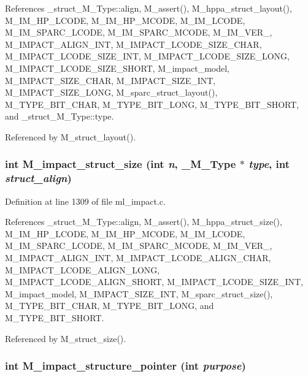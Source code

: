 References \_\-struct\_\-M\_\-Type::align, M\_\-assert(), M\_\-hppa\_\-struct\_\-layout(), M\_\-IM\_\-HP\_\-LCODE, M\_\-IM\_\-HP\_\-MCODE, M\_\-IM\_\-LCODE, M\_\-IM\_\-SPARC\_\-LCODE, M\_\-IM\_\-SPARC\_\-MCODE, M\_\-IM\_\-VER\_, M\_\-IMPACT\_\-ALIGN\_\-INT, M\_\-IMPACT\_\-LCODE\_\-SIZE\_\-CHAR, M\_\-IMPACT\_\-LCODE\_\-SIZE\_\-INT, M\_\-IMPACT\_\-LCODE\_\-SIZE\_\-LONG, M\_\-IMPACT\_\-LCODE\_\-SIZE\_\-SHORT, M\_\-impact\_\-model, M\_\-IMPACT\_\-SIZE\_\-CHAR, M\_\-IMPACT\_\-SIZE\_\-INT, M\_\-IMPACT\_\-SIZE\_\-LONG, M\_\-sparc\_\-struct\_\-layout(), M\_\-TYPE\_\-BIT\_\-CHAR, M\_\-TYPE\_\-BIT\_\-LONG, M\_\-TYPE\_\-BIT\_\-SHORT, and \_\-struct\_\-M\_\-Type::type.

Referenced by M\_\-struct\_\-layout().
\subsubsection{\setlength{\rightskip}{0pt plus 5cm}int M\_\-impact\_\-struct\_\-size (int {\em n}, \bf{\_\-M\_\-Type} $\ast$ {\em type}, int {\em struct\_\-align})}\label{m__impact_8h_bb17feb90e9135abecae6b3ad811df53}




Definition at line 1309 of file ml\_\-impact.c.

References \_\-struct\_\-M\_\-Type::align, M\_\-assert(), M\_\-hppa\_\-struct\_\-size(), M\_\-IM\_\-HP\_\-LCODE, M\_\-IM\_\-HP\_\-MCODE, M\_\-IM\_\-LCODE, M\_\-IM\_\-SPARC\_\-LCODE, M\_\-IM\_\-SPARC\_\-MCODE, M\_\-IM\_\-VER\_, M\_\-IMPACT\_\-ALIGN\_\-INT, M\_\-IMPACT\_\-LCODE\_\-ALIGN\_\-CHAR, M\_\-IMPACT\_\-LCODE\_\-ALIGN\_\-LONG, M\_\-IMPACT\_\-LCODE\_\-ALIGN\_\-SHORT, M\_\-IMPACT\_\-LCODE\_\-SIZE\_\-INT, M\_\-impact\_\-model, M\_\-IMPACT\_\-SIZE\_\-INT, M\_\-sparc\_\-struct\_\-size(), M\_\-TYPE\_\-BIT\_\-CHAR, M\_\-TYPE\_\-BIT\_\-LONG, and M\_\-TYPE\_\-BIT\_\-SHORT.

Referenced by M\_\-struct\_\-size().
\subsubsection{\setlength{\rightskip}{0pt plus 5cm}int M\_\-impact\_\-structure\_\-pointer (int {\em purpose})}\label{m__impact_8h_1e48123c0c27b0057bc099de33959c55}




